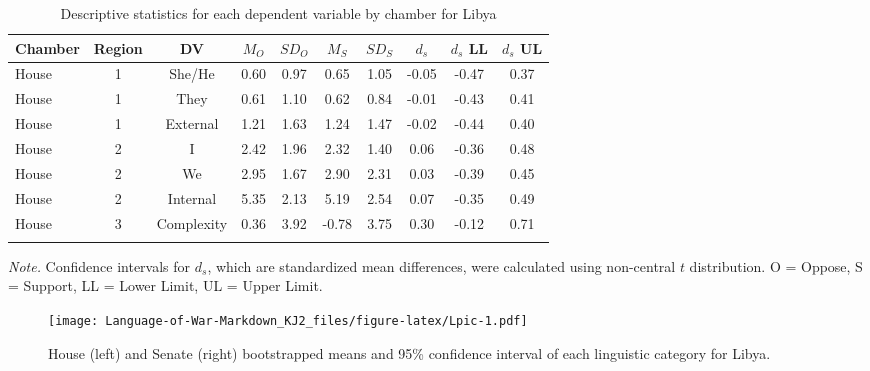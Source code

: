 \documentclass[jou,a4paper]{apa6}
\begin{document}
\begin{table}[htbp]

\begin{center}
\begin{threeparttable}

\caption{\label{tab:Ltable}Descriptive statistics for each dependent variable by chamber for Libya}

\small{

\begin{tabular}{lccccccccc}
\toprule
Chamber & Region & DV & $M_O$ & $SD_O$ & $M_S$ & $SD_S$ & $d_s$ & $d_s$ LL & $d_s$ UL\\
\midrule
House & 1 & She/He & 0.60 & 0.97 & 0.65 & 1.05 & -0.05 & -0.47 & 0.37\\
House & 1 & They & 0.61 & 1.10 & 0.62 & 0.84 & -0.01 & -0.43 & 0.41\\
House & 1 & External & 1.21 & 1.63 & 1.24 & 1.47 & -0.02 & -0.44 & 0.40\\
House & 2 & I & 2.42 & 1.96 & 2.32 & 1.40 & 0.06 & -0.36 & 0.48\\
House & 2 & We & 2.95 & 1.67 & 2.90 & 2.31 & 0.03 & -0.39 & 0.45\\
House & 2 & Internal & 5.35 & 2.13 & 5.19 & 2.54 & 0.07 & -0.35 & 0.49\\
House & 3 & Complexity & 0.36 & 3.92 & -0.78 & 3.75 & 0.30 & -0.12 & 0.71\\
\bottomrule
\addlinespace
\end{tabular}

}

\begin{tablenotes}[para]
\normalsize{\textit{Note.} Confidence intervals for $d_s$, which are standardized mean differences, were calculated using 
          non-central $t$ distribution. O = Oppose, S = Support, LL = Lower Limit, UL = Upper Limit.}
\end{tablenotes}

\end{threeparttable}
\end{center}

\end{table}

\begin{figure}
\centering
\texttt{[image: Language-of-War-Markdown\_KJ2\_files/figure-latex/Lpic-1.pdf]}
\caption{\label{fig:Lpic}House (left) and Senate (right) bootstrapped means and 95\% confidence interval of each linguistic category for Libya.}
\end{figure}
\end{document}
